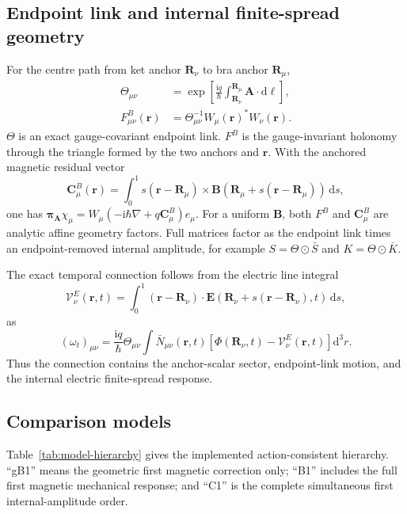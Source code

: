 \documentclass[11pt]{article}
\newcommand{\iu}{\mathrm{i}}
\newcommand{\dd}{\mathrm{d}}
\newcommand{\A}{\mathbf A}
\newcommand{\B}{\mathbf B}
\newcommand{\E}{\mathbf E}
\newcommand{\R}{\mathbf R}
\newcommand{\rvec}{\mathbf r}
\begin{document}
\subsection{Endpoint link and internal finite-spread geometry}

For the centre path from ket anchor $\R_\nu$ to bra anchor $\R_\mu$,
\begin{align}
 \Theta_{\mu\nu}
 &=\exp\!\left[\frac{\iu q}{\hbar}
   \int_{\R_\nu}^{\R_\mu}\A\cdot\dd\boldsymbol\ell\right],\\
 F^B_{\mu\nu}(\rvec)
 &=\Theta_{\mu\nu}^{-1}W_\mu(\rvec)^*W_\nu(\rvec).
\end{align}
$\Theta$ is an exact gauge-covariant endpoint link.  $F^B$ is the
gauge-invariant holonomy through the triangle formed by the two anchors and
$\rvec$.  With the anchored magnetic residual vector
\begin{equation}
 \mathbf C_\mu^B(\rvec)=\int_0^1s(\rvec-\R_\mu)\times
 \B(\R_\mu+s(\rvec-\R_\mu))\,\dd s,
\end{equation}
one has
$\boldsymbol\pi_\A\chi_\mu=W_\mu(-\iu\hbar\nabla+q\mathbf C_\mu^B)e_\mu$.
For a uniform $\B$, both $F^B$ and $\mathbf C_\mu^B$ are analytic affine
geometry factors.  Full matrices factor as the endpoint link times an
endpoint-removed internal amplitude, for example
$S=\Theta\odot\bar S$ and $K=\Theta\odot\bar K$.

The exact temporal connection follows from the electric line integral
\begin{equation}
 \mathcal V_\nu^E(\rvec,t)=\int_0^1(\rvec-\R_\nu)\cdot
 \E(\R_\nu+s(\rvec-\R_\nu),t)\,\dd s,
\end{equation}
as
\begin{equation}
 (\omega_t)_{\mu\nu}=\frac{\iu q}{\hbar}\Theta_{\mu\nu}
 \int \bar N_{\mu\nu}(\rvec,t)
 \left[\Phi(\R_\nu,t)-\mathcal V_\nu^E(\rvec,t)\right]\dd^3r.
\end{equation}
Thus the connection contains the anchor-scalar sector, endpoint-link motion,
and the internal electric finite-spread response.

\subsection{Comparison models}

Table~\ref{tab:model-hierarchy} gives the implemented action-consistent
hierarchy.  ``gB1'' means the geometric first magnetic correction only;
``B1'' includes the full first magnetic mechanical response; and ``C1'' is
the complete simultaneous first internal-amplitude order.
\end{document}
